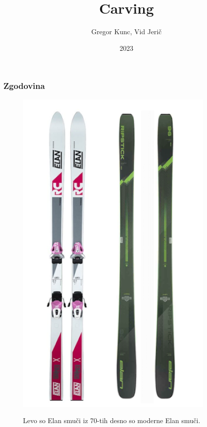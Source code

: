 \documentclass{beamer}
\title{Carving}
\author{Gregor Kunc, Vid Jerič}
\date{2023}
\begin{document}
\frame{\titlepage}

\begin{frame}
\frametitle{Zgodovina}

\begin{figure}
    \centering
    \includegraphics[scale=0.3]{../images/elan smuci.png} \\
    \caption[short]{Levo so Elan smuči iz 70-tih desno so moderne Elan smuči.}
\end{figure}

\end{frame}
\end{document}
